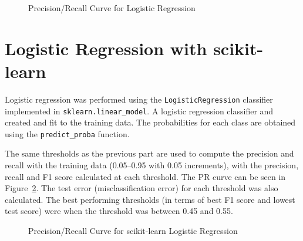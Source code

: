 \documentclass[12pt]{article}
\begin{document}
\begin{figure}[htp]
\centering
{}
\caption{Precision/Recall Curve for Logistic Regression}
\label{fig:logreg}
\end{figure}


\section*{Logistic Regression with scikit-learn}
Logistic regression was performed using the \texttt{LogisticRegression} classifier implemented in \texttt{sklearn.linear\_model}. A logistic regression classifier and created and fit to the training data. The probabilities for each class are obtained using the \texttt{predict\_proba} function.

The same thresholds as the previous part are used to compute the precision and recall with the training data (0.05--0.95 with 0.05 increments), with the precision, recall and F1 score calculated at each threshold. The PR curve can be seen in Figure~\ref{fig:logreg_scikit}. The test error (misclassification error) for each threshold was also calculated. The best performing thresholds (in terms of best F1 score and lowest test score) were when the threshold was between 0.45 and 0.55.

\begin{figure}[htp]
\centering
{}
\caption{Precision/Recall Curve for scikit-learn Logistic Regression}
\label{fig:logreg_scikit}
\end{figure}
\end{document}
